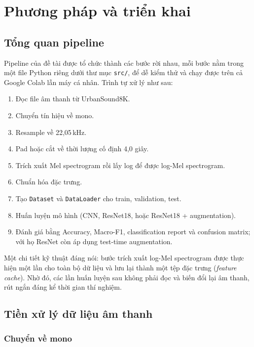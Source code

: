 \section{Phương pháp và triển khai}
\label{sec:method}

\subsection{Tổng quan pipeline}

Pipeline của đề tài được tổ chức thành các bước rời nhau, mỗi bước nằm trong một
file Python riêng dưới thư mục \texttt{src/}, để dễ kiểm thử và chạy được trên cả
Google Colab lẫn máy cá nhân. Trình tự xử lý như sau:

\begin{enumerate}[leftmargin=1.6em,itemsep=1pt]
  \item Đọc file âm thanh từ UrbanSound8K.
  \item Chuyển tín hiệu về mono.
  \item Resample về 22{,}05\,kHz.
  \item Pad hoặc cắt về thời lượng cố định 4{,}0 giây.
  \item Trích xuất Mel spectrogram rồi lấy log để được log-Mel spectrogram.
  \item Chuẩn hóa đặc trưng.
  \item Tạo \texttt{Dataset} và \texttt{DataLoader} cho train, validation, test.
  \item Huấn luyện mô hình (CNN, ResNet18, hoặc ResNet18 + augmentation).
  \item Đánh giá bằng Accuracy, Macro-F1, classification report và confusion
        matrix; với họ ResNet còn áp dụng test-time augmentation.
\end{enumerate}

Một chi tiết kỹ thuật đáng nói: bước trích xuất log-Mel spectrogram được thực
hiện một lần cho toàn bộ dữ liệu và lưu lại thành một tệp đặc trưng
(\textit{feature cache}). Nhờ đó, các lần huấn luyện sau không phải đọc và biến
đổi lại âm thanh, rút ngắn đáng kể thời gian thí nghiệm.

\subsection{Tiền xử lý dữ liệu âm thanh}

\subsubsection{Chuyển về mono}

